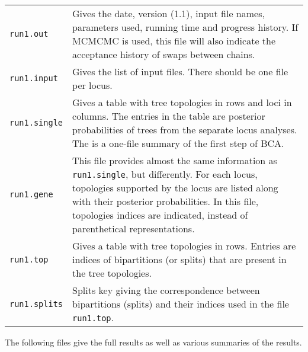 \documentclass[12pt,english,final,letterpaper]{article}
\begin{document}
\hspace*{-1in}
\begin{tabular}{l|p{6in}}
{\tt run1.out}& Gives the date, version (1.1), input file names, 
parameters used, running time and progress history. If MCMCMC is used, 
this file will also indicate the acceptance history of swaps between chains.\\
{\tt run1.input}& Gives the list of input files. There should be one file 
per locus.\\
{\tt run1.single}& Gives a table with tree topologies in rows and loci in 
columns. The entries in the table are posterior probabilities of trees from the
separate locus analyses. The is a one-file summary of the first step of BCA.\\
{\tt run1.gene}& This file provides almost the same information as 
{\tt run1.single}, but differently. For each locus, topologies supported 
by the locus are listed along with their posterior probabilities. In this file,
topologies indices are indicated, instead of parenthetical representations.\\
{\tt run1.top}& Gives a table with tree topologies in rows. Entries are 
indices of bipartitions (or splits) that are present in the tree topologies.\\
{\tt run1.splits}&Splits key giving the correspondence between bipartitions
(splits) and their indices used in the file {\tt run1.top}.\\
\end{tabular}
\bigskip\bigskip

The following files give the full results as well as various summaries of the 
results.
\bigskip
\end{document}
